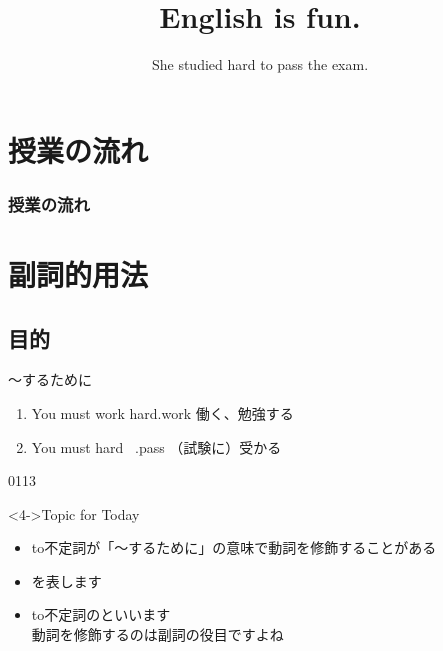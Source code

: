 \documentclass[aspectratio=169,xcolor={dvipsnames,table}]{beamer}
\title{English is fun.}
\subtitle{She studied hard to pass the exam.}
\author{}
\institute[]{}
\date[]
\begin{document}
\begin{frame}[plain]
  \titlepage
\end{frame}

\section*{授業の流れ}
\begin{frame}[plain]
  \frametitle{授業の流れ}
  \tableofcontents
\end{frame}

\section{副詞的用法}
\subsection{目的}
\begin{frame}[plain]{～するために}
 \large

\begin{enumerate}
 \item<1-> You must work hard.\hfill{\scriptsize work  働く、勉強する}
 \item<2-> You must hard \,\,\,.\hfill{\scriptsize pass  （試験に）受かる}

\end{enumerate}


%
\hfill{\tiny 0113}\,{\scriptsize {}}
%
\begin{block}<4->{Topic for Today}
\begin{itemize}[square]\small
 \item to不定詞が「〜するために」の意味で動詞を修飾することがある
 \item {}を表します
 \item to不定詞のといいます\\
       \hfill{\scriptsize 動詞を修飾するのは副詞の役目ですよね}
 \end{itemize}
     \end{block}

\end{frame}
\end{document}
